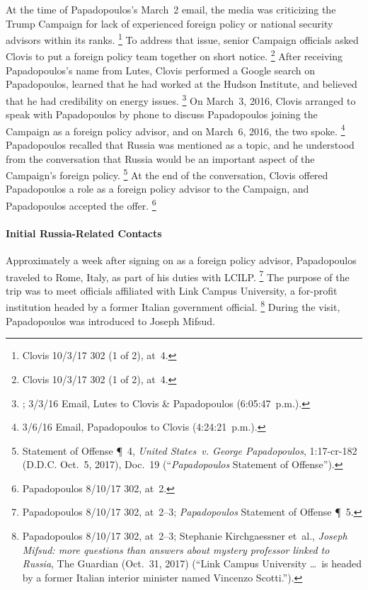 At the time of Papadopoulos's March~2 email, the media was criticizing the Trump Campaign for lack of experienced foreign policy or national security advisors within its ranks.%
\footnote{Clovis 10/3/17 302 (1 of 2), at~4.}
To address that issue, senior Campaign officials asked Clovis to put a foreign policy team together on short notice.%
\footnote{Clovis 10/3/17 302 (1 of 2), at~4.}
After receiving Papadopoulos's name from Lutes, Clovis performed a Google search on Papadopoulos, learned that he had worked at the Hudson Institute, and believed that he had credibility on energy issues.%
\footnote{; 3/3/16 Email, Lutes to Clovis \& Papadopoulos (6:05:47~p.m.).}
On March~3, 2016, Clovis arranged to speak with Papadopoulos by phone to discuss Papadopoulos joining the Campaign as a foreign policy advisor, and on March~6, 2016, the two spoke.%
\footnote{3/6/16 Email, Papadopoulos to Clovis (4:24:21~p.m.).}
Papadopoulos recalled that Russia was mentioned as a topic, and he understood from the conversation that Russia would be an important aspect of the Campaign's foreign policy.%
\footnote{Statement of Offense \P~4, \textit{United States~v. George Papadopoulos}, 1:17-cr-182 (D.D.C. Oct.~5,
2017), Doc.~19 (``\textit{Papadopoulos} Statement of Offense'').}
At the end of the conversation, Clovis offered Papadopoulos a role as a foreign policy advisor to the Campaign, and Papadopoulos accepted the offer.%
\footnote{Papadopoulos 8/10/17 302, at~2.}

\paragraph{Initial Russia-Related Contacts}

Approximately a week after signing on as a foreign policy advisor, Papadopoulos traveled to Rome, Italy, as part of his duties with LCILP.%
\footnote{Papadopoulos 8/10/17 302, at~2--3; \textit{Papadopoulos} Statement of Offense \P~5.}
The purpose of the trip was to meet officials affiliated with Link Campus University, a for-profit institution headed by a former Italian government official.%
\footnote{Papadopoulos 8/10/17 302, at~2--3;
Stephanie Kirchgaessner et~al., \textit{Joseph Mifsud: more questions than answers about mystery professor linked to Russia}, The Guardian (Oct.~31, 2017) (``Link Campus University \dots\ is headed by a former Italian interior minister named Vincenzo Scotti.'').}
During the visit, Papadopoulos was introduced to Joseph Mifsud.

